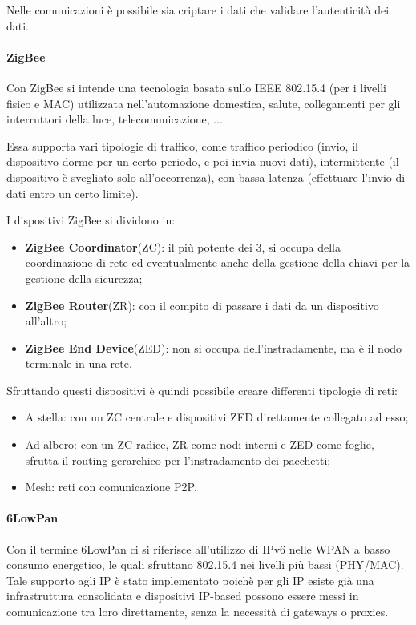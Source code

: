 Nelle comunicazioni è possibile sia criptare i dati che validare l'autenticità 
dei dati.

\paragraph{ZigBee}
Con ZigBee si intende una tecnologia basata sullo IEEE 802.15.4 (per i livelli 
fisico e MAC) utilizzata nell'automazione domestica, salute, collegamenti per 
gli interruttori della luce, telecomunicazione, ...

Essa supporta vari tipologie di traffico, come traffico periodico (invio, il 
dispositivo dorme per un certo periodo, e poi invia nuovi dati), intermittente 
(il dispositivo è svegliato solo all'occorrenza), con bassa latenza (effettuare
 l'invio di dati entro un certo limite). 

I dispositivi ZigBee si dividono in:
\begin{itemize}
  \item \textbf{ZigBee Coordinator}(ZC): il più potente dei 3, si occupa della 
        coordinazione di rete ed eventualmente anche della gestione della chiavi 
        per la gestione della sicurezza;
  \item \textbf{ZigBee Router}(ZR): con il compito di passare i dati da un 
        dispositivo all'altro;
  \item \textbf{ZigBee End Device}(ZED): non si occupa dell'instradamente, ma è 
        il nodo terminale in una rete.
\end{itemize}

Sfruttando questi dispositivi è quindi possibile creare differenti tipologie di 
reti:
\begin{itemize}
  \item A stella: con un ZC centrale e dispositivi ZED direttamente collegato ad 
        esso;
  \item Ad albero: con un ZC radice, ZR come nodi interni e ZED come foglie, 
        sfrutta il routing gerarchico per l'instradamento dei pacchetti;
  \item Mesh: reti con comunicazione P2P.
\end{itemize}

\paragraph{6LowPan}
Con il termine 6LowPan ci si riferisce all'utilizzo di IPv6 nelle WPAN a basso 
consumo energetico, le quali sfruttano 802.15.4 nei livelli più bassi (PHY/MAC). 
Tale supporto agli IP è stato implementato poichè per gli IP esiste già una 
infrastruttura consolidata e dispositivi IP-based possono essere messi in 
comunicazione tra loro direttamente, senza la necessità di gateways o proxies.


